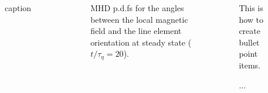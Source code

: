 \documentclass[20pt, a0paper, landscape, margin=15mm, innermargin=15mm,
     blockverticalspace=15mm, colspace=15mm, subcolspace=8mm]{tikzposter} %
\newcommand{\plot}[3]{
\begin{figure}[H]
    \centering
    \scriptsize
    \scalebox{1.2}{}
    \caption{\footnotesize{#2}}
    \label{#3}
\end{figure}
}
\begin{document}
\begin{columns}
{            \begin{minipage}[t]{30cm}


                    \plot{figures/hd_line_evo}
                    {caption}
                    {line_stretching}

                \plot{figures/histograms/mhd_strain_magnetic_angle_histo_t20}
                    {MHD p.d.fs for the angles between the local magnetic field and the
                    line element orientation at steady state ($t/\tau_{\eta} = 20$).}
                    {mhd_strain_magnetic_angle_histo}


            \end{minipage}
            \hfill
            \begin{minipage}[t]{30cm}

                    \begin{itemsposter}
                    \item
                        This is how to create bullet point items.
                    \item
                        ...
                    \end{itemsposter}
                
            \end{minipage}
         
        }
	
	\end{columns}
	
\end{document}
